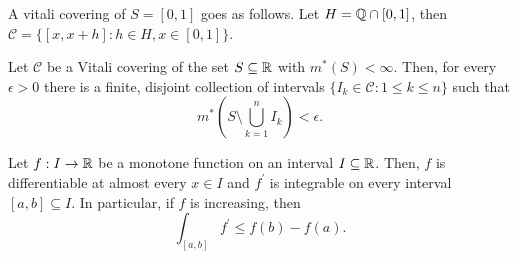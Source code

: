 \begin{example}
	A vitali covering of \(S = \left[ 0, 1 \right] \) goes as follows. Let \(H = \mathbb{Q} \cap \left[ 0, 1 \right] \), then \( \mathscr{C} = \{\left[ x, x + h \right] : h \in H, x \in \left[ 0, 1 \right]  \} \).
\end{example}
\begin{theorem}
	Let \(\mathscr{C}\) be a Vitali covering of the set \(S \subseteq \mathbb{R}\) with \(m^{*}\left( S \right) < \infty\). Then, for every \(\epsilon > 0\) there is a finite, disjoint collection of intervals \(\{I_{k} \in \mathscr{C} : 1 \le k \le n\} \) such that \[
		m^{*}\left( S \setminus \bigcup_{k=1} ^{n}I_{k} \right) < \epsilon
	.\]
\end{theorem}
\newpage
\begin{theorem}
	Let \(f: I \to \mathbb{R}\) be a monotone function on an interval \(I \subseteq \mathbb{R}\). Then, \(f\) is differentiable at almost every \(x \in I\) and \(f^{\prime}\) is integrable on every interval \(\left[ a, b \right] \subseteq I\). In particular, if \(f\) is increasing, then \[
		\int_{\left[ a, b \right] }f^{\prime} \le f\left( b \right)  - f\left( a \right)
	.\]
\end{theorem}

